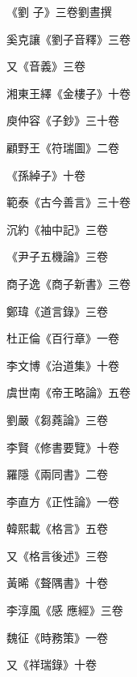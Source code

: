 \begin{pinyinscope}
 《劉
 子》三卷劉晝撰



 奚克讓《劉子音釋》三卷



 又《音義》三卷



 湘東王繹《金樓子》十卷



 庾仲容《子鈔》三十卷



 顧野王《符瑞圖》二卷



 《孫綽子》十卷



 範泰《古今善言》三十卷



 沉約《袖中記》三卷



 《尹子五機論》三卷



 商子逸《商子新書》三卷



 鄭瑋《道言錄》三卷



 杜正倫《百行章》一卷



 李文博《治道集》十卷



 虞世南《帝王略論》五卷



 劉嚴《芻蕘論》三卷



 李賢《修書要覽》十卷



 羅隱《兩同書》二卷



 李直方《正性論》一卷



 韓熙載《格言》五卷



 又《格言後述》三卷



 黃晞《聱隅書》十卷



 李淳風《感
 應經》三卷



 魏征《時務策》一卷



 又《祥瑞錄》十卷




\end{pinyinscope}
